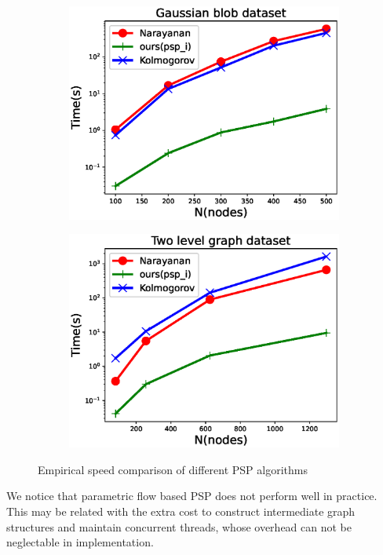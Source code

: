 \begin{figure}
	\centering
	\begin{subfigure}{0.45\textwidth}
		\includegraphics[width=\textwidth]{pic/2019-08-26-gaussian.eps}
	\end{subfigure}
	\begin{subfigure}{0.45\textwidth}
		\includegraphics[width=\textwidth]{pic/2019-09-19-two_level.eps}
	\end{subfigure}
	\caption{Empirical speed comparison of different PSP algorithms}\label{fig:esc}
\end{figure}

We notice that parametric flow based PSP \citep{kolmogorov}  does not perform well in practice. This may be related with the extra cost to construct intermediate graph structures and maintain concurrent threads, whose overhead can not be neglectable in implementation.

